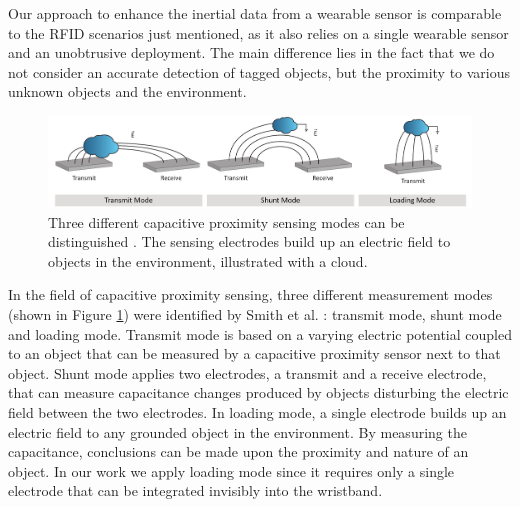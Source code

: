 \documentclass[runningheads,a4paper]{llncs}
\begin{document}
Our approach to enhance the inertial data from a wearable sensor is comparable to the RFID scenarios just mentioned, as it also relies on a single wearable sensor and an unobtrusive deployment. The main difference lies in the fact that we do not consider an accurate detection of tagged objects, but the proximity to various unknown objects and the environment. 


\begin{figure}
	\centering
		\includegraphics[width=1.00\textwidth]{Images/modes.pdf}
	\caption{Three different capacitive proximity sensing modes can be distinguished \cite{Smith1996}. The sensing electrodes build up an electric field to objects in the environment, illustrated with a cloud.}
	\label{fig:modes}
\end{figure}

In the field of capacitive proximity sensing, three different measurement modes (shown in Figure \ref{fig:modes}) were identified by Smith et al. \cite{Smith1999}: transmit mode, shunt mode and loading mode. Transmit mode is based on a varying electric potential coupled to an object that can be measured by a capacitive proximity sensor next to that object. Shunt mode applies two electrodes, a transmit and a receive electrode, that can measure capacitance changes produced by objects disturbing the electric field between the two electrodes. In loading mode, a single electrode builds up an electric field to any grounded object in the environment. By measuring the capacitance, conclusions can be made upon the proximity and nature of an object. In our work we apply loading mode since it requires only a single electrode that can be integrated invisibly into the wristband.
\end{document}

